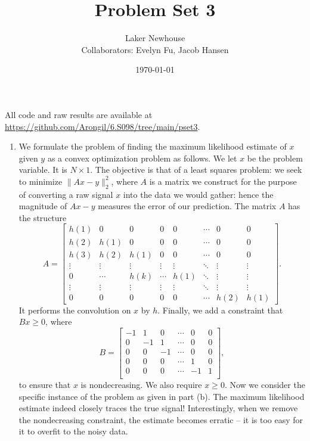 \documentclass{article}
\title{Problem Set 3}
\author{Laker Newhouse\\Collaborators: Evelyn Fu, Jacob Hansen}
\date{\today}
\begin{document}
\maketitle	

All code and raw results are available at \url{https://github.com/Arongil/6.S098/tree/main/pset3}.
\begin{enumerate}
    \item We formulate the problem of finding the maximum likelihood estimate of $x$ given $y$ as a convex optimization problem as follows. We let $x$ be the problem variable. It is $N \times 1$. The objective is that of a least squares problem: we seek to minimize $\| Ax - y \|_2^2$, where $A$ is a matrix we construct for the purpose of converting a raw signal $x$ into the data we would gather: hence the magnitude of $Ax - y$ measures the error of our prediction. The matrix $A$ has the structure \[
        A = \begin{bmatrix}
            h(1) & 0 & 0 & 0 & 0 & \cdots & 0 & 0 \\
            h(2) & h(1) & 0 & 0 & 0 & \cdots & 0 & 0 \\
            h(3) & h(2) & h(1) & 0 & 0 & \cdots & 0 & 0 \\
            \vdots & \vdots & \vdots & \vdots & \vdots & \ddots & \vdots & \vdots \\
            0 & \cdots & h(k) & \cdots & h(1) & \ddots & \vdots & \vdots \\
            \vdots & \vdots & \vdots & \vdots & \vdots & \ddots & \vdots & \vdots \\
            0 & 0 & 0 & 0 & 0 & \cdots & h(2) & h(1)
    \end{bmatrix}.
\] It performs the convolution on $x$ by $h$. Finally, we add a constraint that $Bx \geq 0$, where \[
        B = \begin{bmatrix}
            -1 & 1 & 0 & \cdots & 0 & 0 \\
            0 & -1 & 1 & \cdots & 0 & 0 \\
            0 & 0 & -1 & \cdots & 0 & 0 \\
            0 & 0 & 0 & \cdots & 1 & 0 \\
            0 & 0 & 0 & \cdots & -1 & 1 \\
        \end{bmatrix},
    \] to ensure that $x$ is nondecreasing. We also require $x \geq 0$. Now we consider the specific instance of the problem as given in part (b). The maximum likelihood estimate indeed closely traces the true signal! Interestingly, when we remove the nondecreasing constraint, the estimate becomes erratic -- it is too easy for it to overfit to the noisy data.


\end{enumerate}
\end{document}
